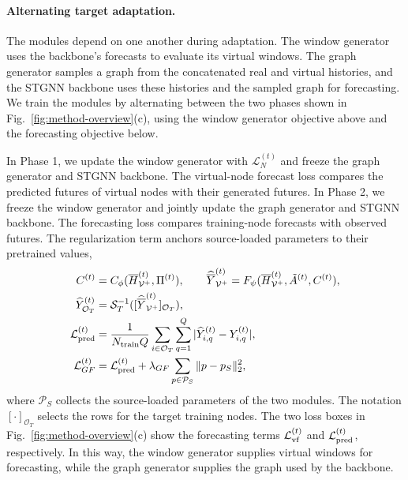 \documentclass[runningheads,a4paper]{llncs}
\begin{document}
\paragraph{Alternating target adaptation.}
The modules depend on one another during adaptation. The window generator uses the backbone's forecasts to evaluate its virtual windows. The graph generator samples a graph from the concatenated real and virtual histories, and the STGNN backbone uses these histories and the sampled graph for forecasting. We train the modules by alternating between the two phases shown in Fig.~\ref{fig:method-overview}(c), using the window generator objective above and the forecasting objective below.

In Phase 1, we update the window generator with $\mathcal L_N^{(t)}$ and freeze the graph generator and STGNN backbone. The virtual-node forecast loss compares the predicted futures of virtual nodes with their generated futures. In Phase 2, we freeze the window generator and jointly update the graph generator and STGNN backbone. The forecasting loss compares training-node forecasts with observed futures. The regularization term anchors source-loaded parameters to their pretrained values,
\begin{equation}
\begin{aligned}
  C^{(t)}&=C_\phi(\overline H_{\mathcal V^{+}}^{(t)},\Pi^{(t)}),\qquad
  \widehat{\overline Y}_{\mathcal V^{+}}^{(t)}=F_\psi(\overline H_{\mathcal V^{+}}^{(t)},\tilde A^{(t)},C^{(t)}),\\
  \widehat Y_{\mathcal O_{T}}^{(t)}&=\mathcal S_T^{-1}([\widehat{\overline Y}_{\mathcal V^{+}}^{(t)}]_{\mathcal O_{T}}),\\
  \mathcal L_{\rm pred}^{(t)}&=\frac{1}{\text{$N_{\mathrm{train}}$}Q}\sum_{i\in\mathcal O_{T}}\sum_{q=1}^{Q}
      |\widehat Y_{i,q}^{(t)}-Y_{i,q}^{(t)}|,\\
  \mathcal L_{GF}^{(t)}&=\mathcal L_{\rm pred}^{(t)}
      +\lambda_{GF}\sum_{p\in\mathcal P_S}\|p-p_S\|_2^2,
\end{aligned}
  \label{eq:target-objectives}
\end{equation}
where $\mathcal P_S$ collects the source-loaded parameters of the two modules. The notation $[\cdot]_{\mathcal O_T}$ selects the rows for the target training nodes. The two loss boxes in Fig.~\ref{fig:method-overview}(c) show the forecasting terms $\mathcal L_{\rm vf}^{(t)}$ and $\mathcal L_{\rm pred}^{(t)}$, respectively. In this way, the window generator supplies virtual windows for forecasting, while the graph generator supplies the graph used by the backbone.
\end{document}

